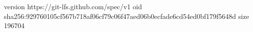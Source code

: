 version https://git-lfs.github.com/spec/v1
oid sha256:929760105cf567b718af06cf79c06f47aed06b0ecfade6cd54ed0bf179f5648d
size 196704
